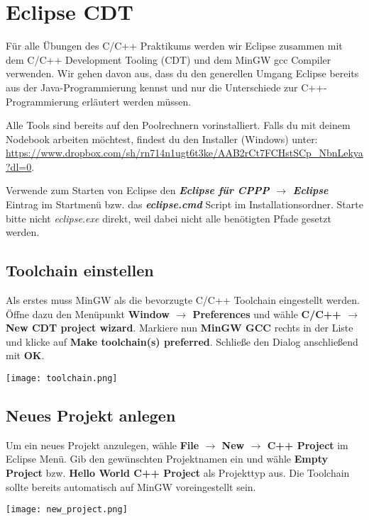 \section{Eclipse CDT}

Für alle Übungen des C/C++ Praktikums werden wir Eclipse zusammen mit dem C/C++ Development Tooling (CDT) und dem MinGW gcc Compiler verwenden.
Wir gehen davon aus, dass du den generellen Umgang Eclipse bereits aus der Java-Programmierung kennst und nur die Unterschiede zur C++-Programmierung erläutert werden müssen.

Alle Tools sind bereits auf den Poolrechnern vorinstalliert.
Falls du mit deinem Nodebook arbeiten möchtest, findest du den Installer (Windows) unter: \url{https://www.dropbox.com/sh/rn714n1ugt6t3ke/AAB2rCt7FCHstSCp_NbnLekya?dl=0}.

Verwende zum Starten von Eclipse den \textbf{\emph{Eclipse für CPPP $\rightarrow$ Eclipse}} Eintrag im Startmenü bzw. das \textbf{\emph{eclipse.cmd}} Script im Installationsordner.
Starte bitte nicht \emph{eclipse.exe} direkt, weil dabei nicht alle benötigten Pfade gesetzt werden.

\subsection{Toolchain einstellen}

Als erstes muss MinGW als die bevorzugte C/C++ Toolchain eingestellt werden.
Öffne dazu den Menüpunkt \textbf{Window $\rightarrow$   Preferences} und wähle \textbf{C/C++ $\rightarrow$  New CDT project wizard}.
Markiere nun \textbf{MinGW GCC} rechts in der Liste und klicke auf \textbf{Make toolchain(s) preferred}.
Schließe den Dialog anschließend mit \textbf{OK}.

\texttt{[image: toolchain.png]}

\subsection{Neues Projekt anlegen}
Um ein neues Projekt anzulegen, wähle \textbf{File $\rightarrow$ New $\rightarrow$ C++ Project} im Eclipse Menü.
Gib den gewünschten Projektnamen ein und wähle \textbf{Empty Project} bzw. \textbf{Hello World C++ Project} als Projekttyp aus.
Die Toolchain sollte bereits automatisch auf MinGW voreingestellt sein.

\begin{center}
	\texttt{[image: new\_project.png]}
\end{center}

